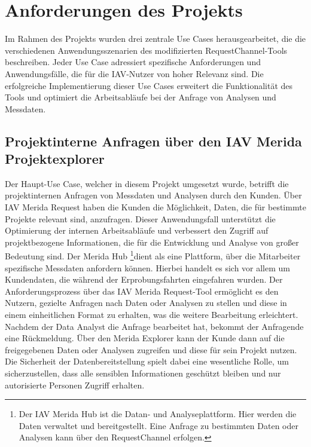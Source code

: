 \chapter{Anforderungen des Projekts}

Im Rahmen des Projekts wurden drei zentrale Use Cases herausgearbeitet, die die verschiedenen Anwendungsszenarien des modifizierten RequestChannel-Tools beschreiben. Jeder Use Case adressiert spezifische Anforderungen und Anwendungsfälle, die für die IAV-Nutzer von hoher Relevanz sind. Die erfolgreiche Implementierung dieser Use Cases erweitert die Funktionalität des Tools und optimiert die Arbeitsabläufe bei der Anfrage von Analysen und Messdaten.
\section{Projektinterne Anfragen über den IAV Merida Projektexplorer}
Der Haupt-Use Case, welcher in diesem Projekt umgesetzt wurde, betrifft die projektinternen Anfragen von Messdaten und Analysen durch den Kunden. Über IAV Merida Request haben die Kunden die Möglichkeit, Daten, die für bestimmte Projekte relevant sind, anzufragen. Dieser Anwendungsfall unterstützt die Optimierung der internen Arbeitsabläufe und verbessert den Zugriff auf projektbezogene Informationen, die für die Entwicklung und Analyse von großer Bedeutung sind.
\newline
Der Merida Hub \footnote[1]{Der IAV Merida Hub ist die Datan- und Analyseplattform. Hier werden die Daten verwaltet und bereitgestellt. Eine Anfrage zu bestimmten Daten oder Analysen kann über den RequestChannel erfolgen.}dient als eine Plattform, über die Mitarbeiter spezifische Messdaten anfordern können. Hierbei handelt es sich vor allem um Kundendaten, die während der Erprobungsfahrten eingefahren wurden. Der Anforderungsprozess über das IAV Merida Request-Tool ermöglicht es den Nutzern, gezielte Anfragen nach Daten oder Analysen zu stellen und diese in einem einheitlichen Format zu erhalten, was die weitere Bearbeitung erleichtert.
\newline
Nachdem der Data Analyst die Anfrage bearbeitet hat, bekommt der Anfragende eine Rückmeldung. Über den Merida Explorer kann der Kunde dann auf die freigegebenen Daten oder Analysen zugreifen und diese für sein Projekt nutzen. Die Sicherheit der Datenbereitstellung spielt dabei eine wesentliche Rolle, um sicherzustellen, dass alle sensiblen Informationen geschützt bleiben und nur autorisierte Personen Zugriff erhalten.
\newline
